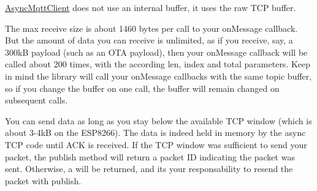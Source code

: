 \mbox{\hyperlink{class_async_mqtt_client}{Async\+Mqtt\+Client}} does not use an internal buffer, it uses the raw TCP buffer.

The max receive size is about 1460 bytes per call to your on\+Message callback. But the amount of data you can receive is unlimited, as if you receive, say, a 300kB payload (such as an OTA payload), then your {\ttfamily on\+Message} callback will be called about 200 times, with the according len, index and total parameters. Keep in mind the library will call your {\ttfamily on\+Message} callbacks with the same topic buffer, so if you change the buffer on one call, the buffer will remain changed on subsequent calls.

You can send data as long as you stay below the available TCP window (which is about 3-\/4kB on the ESP8266). The data is indeed held in memory by the async TCP code until ACK is received. If the TCP window was sufficient to send your packet, the {\ttfamily publish} method will return a packet ID indicating the packet was sent. Otherwise, a {} will be returned, and it\textquotesingle{}s your responsability to resend the packet with {\ttfamily publish}. 